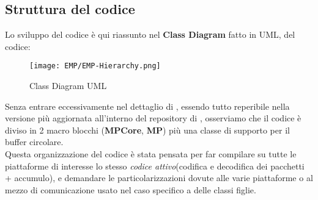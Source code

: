 \subsection{Struttura del codice}
Lo sviluppo del codice è qui riassunto nel \textbf{Class Diagram} fatto in UML, del codice:
\begin{figure}[H]
	\centering
	\caption[Class Diagram UML di EMP]{Class Diagram UML}
	\texttt{[image: EMP/EMP-Hierarchy.png]}
\end{figure}
\noindent
Senza entrare eccessivamente nel dettaglio di , essendo tutto reperibile nella versione più aggiornata all'interno del repository di \cite*{EMP}, osserviamo che il codice è diviso in 2 macro blocchi (\textbf{MPCore}, \textbf{MP}) più una classe di supporto per il buffer circolare.\\
Questa organizzazione del codice è stata pensata per far compilare su tutte le piattaforme di interesse lo stesso \textit{codice attivo}(codifica e decodifica dei pacchetti + accumulo), e demandare le particolarizzazioni dovute alle varie piattaforme o al mezzo di comunicazione usato nel caso specifico a delle classi figlie.\\
